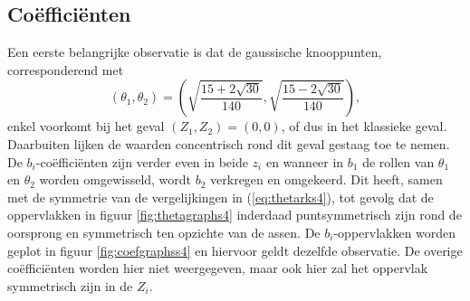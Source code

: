 \documentclass[12pt]{article}
\begin{document}
\subsection{Coëfficiënten}
Een eerste belangrijke observatie is dat de gaussische knooppunten, corresponderend met
\[(\theta_1,\theta_2)=\left(\sqrt{\frac{15+2\sqrt{30}}{140}},\sqrt{\frac{15-2\sqrt{30}}{140}}\right),\]
enkel voorkomt bij het geval \((Z_1,Z_2)=(0,0)\), of dus in het klassieke geval. Daarbuiten lijken de waarden concentrisch rond dit geval gestaag toe te nemen. 
De \(b_i\)-coëfficiënten zijn verder even in beide \(z_i\) en wanneer in \(b_1\) de rollen van \(\theta_1\) en \(\theta_2\) worden omgewisseld, wordt \(b_2\) verkregen en omgekeerd. Dit heeft, samen met de symmetrie van de vergelijkingen in (\ref{eq:thetarks4}), tot gevolg dat de oppervlakken in figuur \ref{fig:thetagraphs4} inderdaad puntsymmetrisch zijn rond de oorsprong en symmetrisch ten opzichte van de assen. De \(b_i\)-oppervlakken worden geplot in figuur \ref{fig:coefgraphss4} en hiervoor geldt dezelfde observatie. De overige coëfficiënten worden hier niet weergegeven, maar ook hier zal het oppervlak symmetrisch zijn in de \(Z_i\).
\end{document}
